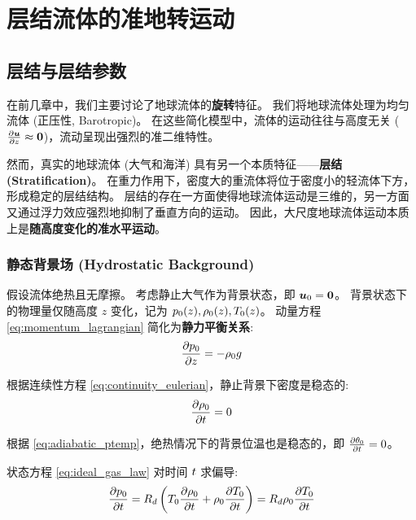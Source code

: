 \section{层结流体的准地转运动}

\subsection{层结与层结参数}

在前几章中，我们主要讨论了地球流体的\textbf{旋转}特征。
我们将地球流体处理为均匀流体 (正压性, Barotropic)。
在这些简化模型中，流体的运动往往与高度无关 ($\pde{\vel}{z} \approx \ivec{0}$)，流动呈现出强烈的准二维特性。

然而，真实的地球流体 (大气和海洋) 具有另一个本质特征——\textbf{层结 (Stratification)}。
在重力作用下，密度大的重流体将位于密度小的轻流体下方，形成稳定的层结结构。
层结的存在一方面使得地球流体运动是三维的，另一方面又通过浮力效应强烈地抑制了垂直方向的运动。
因此，大尺度地球流体运动本质上是\textbf{随高度变化的准水平运动}。

\subsubsection{静态背景场 (Hydrostatic Background)}

假设流体绝热且无摩擦。
考虑静止大气作为背景状态，即 $\bm{u}_0 = \bm{0}$。
背景状态下的物理量仅随高度 $z$ 变化，记为 $p_0(z), \rho_0(z), T_0(z)$。
动量方程 \eqref{eq:momentum_lagrangian} 简化为\textbf{静力平衡关系}:
\begin{equation}
    \pde{\pressure_0}{z} = -\density_0 \gravityconst
    \label{eq:hydrostatic_background}
\end{equation}

根据连续性方程 \eqref{eq:continuity_eulerian}，静止背景下密度是稳态的:
\begin{equation}
    \pde{\density_0}{\timevar} = 0
    \label{eq:continuity_background}
\end{equation}

根据 \eqref{eq:adiabatic_ptemp}，绝热情况下的背景位温也是稳态的，即 $\pde{\ptemp_0}{\timevar} = 0$。

状态方程 \eqref{eq:ideal_gas_law} 对时间 $t$ 求偏导:
\begin{equation*}
    \pde{\pressure_0}{\timevar} = \gasconst \left( \temperature_0 \pde{\density_0}{\timevar} + \density_0 \pde{\temperature_0}{\timevar} \right) = \gasconst \density_0 \pde{\temperature_0}{\timevar}
\end{equation*}

